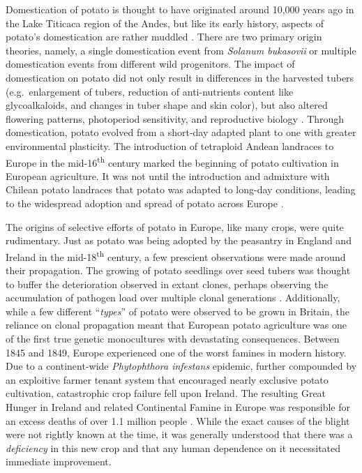 \begin{refsection}
Domestication of potato is thought to have originated around 10,000
years ago in the Lake Titicaca region of the Andes, but like its early
history, aspects of potato's domestication are rather muddled
\parencite{Spooner2005}. There are two primary origin theories, namely, a
single domestication event from \emph{Solanum bukasovii} or multiple
domestication events from different wild progenitors. The impact of
domestication on potato did not only result in differences in the
harvested tubers (e.g.~enlargement of tubers, reduction of
anti-nutrients content like glycoalkaloids, and changes in tuber shape
and skin color), but also altered flowering patterns, photoperiod
sensitivity, and reproductive biology \parencite{Hardigan2017}. Through
domestication, potato evolved from a short-day adapted plant to one with
greater environmental plasticity. The introduction of tetraploid Andean
landraces to Europe in the mid-16\textsuperscript{th} century marked the
beginning of potato cultivation in European agriculture. It was not
until the introduction and admixture with Chilean potato landraces that
potato was adapted to long-day conditions, leading to the widespread
adoption and spread of potato across Europe
\parencite{DeJong2016,Gutaker2019}.

The origins of selective efforts of potato in Europe, like many crops,
were quite rudimentary. Just as potato was being adopted by the
peasantry in England and Ireland in the mid-18\textsuperscript{th}
century, a few prescient observations were made around their
propagation. The growing of potato seedlings over seed tubers was
thought to buffer the deterioration observed in extant clones, perhaps
observing the accumulation of pathogen load over multiple clonal
generations \parencite{Glendinning1983}. Additionally, while a few
different ``\emph{types}'' of potato were observed to be grown in
Britain, the reliance on clonal propagation meant that European potato
agriculture was one of the first true genetic monocultures with
devastating consequences. Between 1845 and 1849, Europe experienced one
of the worst famines in modern history. Due to a continent-wide
\emph{Phytophthora infestans} epidemic, further compounded by an
exploitive farmer tenant system that encouraged nearly exclusive potato
cultivation, catastrophic crop failure fell upon Ireland. The resulting
Great Hunger in Ireland and related Continental Famine in Europe was
responsible for an excess deaths of over 1.1 million people
\parencite{Zadoks2008}. While the exact causes of the blight were not
rightly known at the time, it was generally understood that there was a
\emph{deficiency} in this new crop and that any human
dependence on it necessitated immediate improvement.


\end{refsection}
